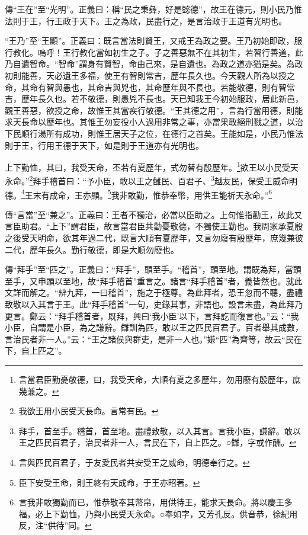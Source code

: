 {\noindent\zhuan{}\fzbyks 傳“王在”至“光明”。正義曰：稱“民之秉彝，好是懿德”，故王在德元，則小民乃惟法則于王，行王政于天下。王之為政，民盡行之，是言治政于王道有光明也。 \par}

{\noindent\shu{}\fzkt “王乃”至“王顯”。正義曰：既言當法則賢王，又戒王為政之要。王乃初始即政，服行教化。嗚呼！王行教化當如初生之子。子之善惡無不在其初生，若習行善道，此乃自遺智命。“智命”謂身有賢智，命由己來，是自遺也。為政之道亦猶是矣。為政初則能善，天必遺王多福，使王有智則常吉，歷年長久也。今天觀人所為以授之命，其命有智與愚也，其命吉與兇也，其命歷年與不長也。若能敬德，則有智常吉，歷年長久也。若不敬德，則愚兇不長也。天已知我王今初始服政，居此新邑，觀王善惡，欲授之命，故惟王其當疾行敬德。“王其德之用”，言為行當用德，則能求天長命以歷年也。其惟王勿妄役小人過用非常之事，亦當果敢絕刑戮之道，以治下民順行湯所有成功，則惟王居天子之位，在德行之首矣。王能如是，小民乃惟法則于王，行用王德于天下，如是則于王道亦有光明也。 \par}

上下勤恤，其曰，我受天命，丕若有夏歷年，式勿替有殷歷年。\footnote{言當君臣勤憂敬德，曰，我受天命，大順有夏之多歷年，勿用廢有殷歷年，庶幾兼之。}欲王以小民受天永命。”\footnote{我欲王用小民受天長命。言常有民。}拜手稽首曰：“予小臣，敢以王之讎民、百君子、\footnote{拜手，首至手。稽首，首至地。盡禮致敬，以入其言。言我小臣，謙辭。敢以王之匹民百君子，治民者非一人，言民在下，自上匹之。○讎，字或作酬。}越友民，保受王威命明德。\footnote{言與匹民百君子，于友愛民者共安受王之威命，明德奉行之。}王末有成命，王亦顯。\footnote{臣下安受王命，則王終有天成命，于王亦昭著。}我非敢勤，惟恭奉幣，用供王能祈天永命。”\footnote{言我非敢獨勤而已，惟恭敬奉其幣帛，用供待王，能求天長命。將以慶王多福，必上下勤恤，乃與小民受天永命。○奉如字，又芳孔反。供音恭，徐紀用反，注“供待”同。}


{\noindent\zhuan{}\fzbyks 傳“言當”至“兼之”。正義曰：王者不獨治，必當以臣助之。上句惟指勸王，故此又言臣助君。“上下”謂君臣，故言當君臣共勤憂敬德，不獨使王勤也。我周家承夏殷之後受天明命，欲其年過二代，既言大順有夏歷年，又言勿廢有殷歷年，庶幾兼彼二代，歷年長久。勤行敬德，即是大順勿廢也。 \par}

{\noindent\zhuan{}\fzbyks 傳“拜手”至“匹之”。正義曰：“拜手”，頭至手。“稽首”，頭至地。謂既為拜，當頭至手，又申頭以至地，故“拜手稽首”重言之。諸言“拜手稽首”者，義皆然也。就此文詳而解之。“辨九拜，一曰稽首”，施之于極尊。為此拜者，恐王忽而不聽，盡禮致敬以入其言于王。此“拜手稽首”一句，史錄其事，非語也。設言未盡，為此拜乃更言。鄭云：“拜手稽首者，既拜，興曰‘我小臣’以下，言拜訖而復言也。”云：“我小臣，自謂是小臣，為之謙辭。讎訓為匹，敢以王之匹民百君子。百者舉其成數，言治民者非一人。”云：“王之諸侯與群吏，是非一人也。”嫌“匹”為齊等，故云“民在下，自上匹之”。 \par}

